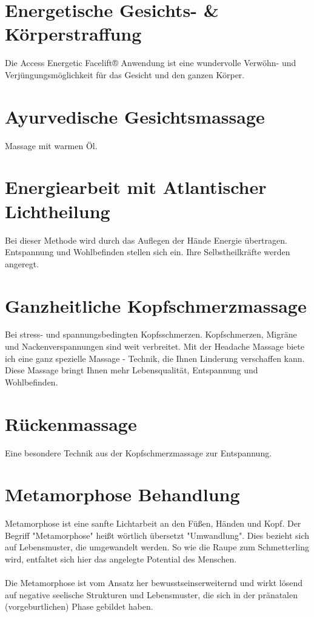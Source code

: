 \documentclass[10pt,foldmark,notumble]{leaflet}
\begin{document}
\vfill
\section{Energetische Gesichts- \& Körperstraffung}
Die Access Energetic Facelift® Anwendung ist eine wundervolle Verwöhn- und Verjüngungsmöglichkeit für das Gesicht und den ganzen Körper.
\section{Ayurvedische Gesichtsmassage}
Massage mit warmen Öl.
\section{Energiearbeit mit Atlantischer Lichtheilung}
Bei dieser Methode wird durch das Auflegen der Hände Energie übertragen. Entspannung und Wohlbefinden stellen sich ein. Ihre Selbstheilkräfte werden angeregt. 
\section{Ganzheitliche Kopfschmerzmassage}
Bei stress- und spannungsbedingten Kopfsschmerzen. 
Kopfschmerzen, Migräne und Nackenverspannungen sind weit verbreitet. Mit der Headache Massage biete ich eine ganz spezielle Massage - Technik, die Ihnen Linderung verschaffen kann. Diese Massage bringt Ihnen mehr Lebensqualität, Entspannung und Wohlbefinden. 
\vfill


\newpage

\vfill
\section{Rückenmassage}
Eine besondere Technik aus der Kopfschmerzmassage zur Entspannung. 
\vfill
\section{Metamorphose Behandlung}
Metamorphose ist eine sanfte Lichtarbeit an den Füßen, Händen und Kopf. Der Begriff "Metamorphose" heißt wörtlich übersetzt "Umwandlung". Dies bezieht sich auf Lebensmuster, die umgewandelt werden. So wie die Raupe zum Schmetterling wird, entfaltet sich hier das angelegte Potential des Menschen.\\
\\
Die Metamorphose ist vom Ansatz her bewusstseins\-erweiternd und wirkt lösend auf negative seelische Strukturen und Lebensmuster, die sich in der pränatalen (vorgeburtlichen) Phase gebildet haben.
\vfill
\end{document}
